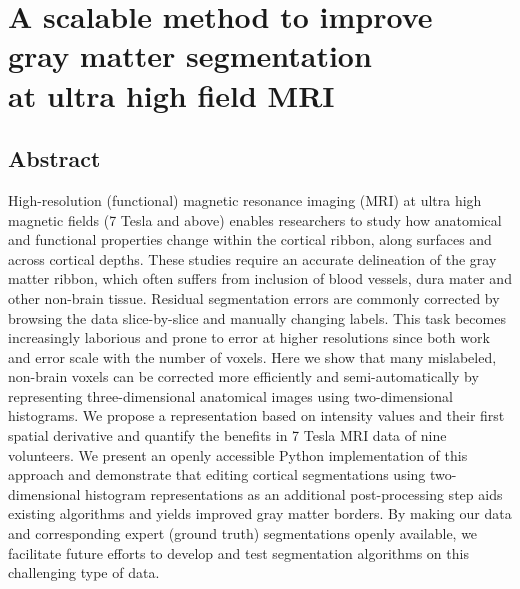 \chapter[A scalable method to improve gray matter segmentation at ultra high field MRI]{A scalable method to improve\\ gray matter segmentation\\ at ultra high field MRI}
\label{ch:chapter02}
\paperciteone

\clearpage{\thispagestyle{empty}\cleardoublepage}

\section{Abstract}
High-resolution (functional) magnetic resonance imaging (MRI) at ultra high magnetic fields (7 Tesla and above) enables researchers to study how anatomical and functional properties change within the cortical ribbon, along surfaces and across cortical depths. These studies require an accurate delineation of the gray matter ribbon, which often suffers from inclusion of blood vessels, dura mater and other non-brain tissue. Residual segmentation errors are commonly corrected by browsing the data slice-by-slice and manually changing labels. This task becomes increasingly laborious and prone to error at higher resolutions since both work and error scale with the number of voxels. Here we show that many mislabeled, non-brain voxels can be corrected more efficiently and semi-automatically by representing three-dimensional anatomical images using two-dimensional histograms. We propose a representation based on intensity values and their first spatial derivative and quantify the benefits in 7 Tesla MRI data of nine volunteers. We present an openly accessible Python implementation of this approach and demonstrate that editing cortical segmentations using two-dimensional histogram representations as an additional post-processing step aids existing algorithms and yields improved gray matter borders. By making our data and corresponding expert (ground truth) segmentations openly available, we facilitate future efforts to develop and test segmentation algorithms on this challenging type of data.

